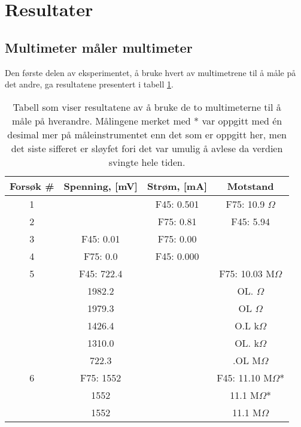 \documentclass[reprint, english,notitlepage]{revtex4-1}  %
\begin{document}
\section{Resultater}

\subsection{Multimeter måler multimeter}
Den første delen av eksperimentet, å bruke hvert av multimetrene til å måle på det andre, ga resultatene presentert i tabell \ref{fig:tabell_multimetre}.

\begin{table}[p]
\label{fig:tabell_multimetre}
\caption{Tabell som viser resultatene av å bruke de to multimeterne til å måle på hverandre. Målingene merket med * var oppgitt med én desimal mer på måleinstrumentet enn det som er oppgitt her, men det siste sifferet er sløyfet fori det var umulig å avlese da verdien svingte hele tiden.}

\begin{adjustbox}{width=\linewidth}
\begin{tabular}{||c || c | c | c||}
\hline
Forsøk \# & Spenning, [mV] & Strøm, [mA] & Motstand  \\ \hline\hline
1 &            & F45: 0.501 & F75: 10.9 $\Omega$    \\ \hline
2 &            & F75: 0.81  & F45: 5.94             \\ \hline
3 & F45: 0.01  & F75: 0.00  &                       \\ \hline
4 & F75: 0.0   & F45: 0.000 &                       \\ \hline
5 & F45: 722.4 &            & F75: 10.03 M$\Omega$  \\ \hline
  &     1982.2 &            &        OL. $\Omega$   \\ \hline
  &     1979.3 &            &        OL $\Omega$    \\ \hline
  &     1426.4 &            &        O.L k$\Omega$  \\ \hline
  &     1310.0 &            &        OL. k$\Omega$  \\ \hline
  &      722.3 &            &        .OL  M$\Omega$ \\ \hline
6 & F75:  1552 &            & F45: 11.10 M$\Omega$*  \\ \hline
  &       1552 &            & 11.1 M$\Omega$*        \\ \hline
  &       1552 &            & 11.1 M$\Omega$         \\ \hline
\end{tabular}
\end{adjustbox}
\end{table}
\end{document}

